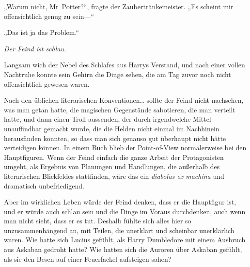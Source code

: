 „Warum nicht, Mr~Potter?“, fragte der Zaubertränkemeister. „Es scheint mir offensichtlich genug zu sein—“

„Das ist ja das Problem.“

\emph{Der Feind ist schlau.}

Langsam wich der Nebel des Schlafes aus Harrys Verstand, und nach einer vollen Nachtruhe konnte sein Gehirn die Dinge sehen, die am Tag zuvor noch nicht offensichtlich gewesen waren.

Nach den üblichen literarischen Konventionen… sollte der Feind nicht nachsehen, was man getan hatte, die magischen Gegenstände sabotieren, die man verteilt hatte, und dann einen Troll aussenden, der durch irgendwelche Mittel unauffindbar gemacht wurde, die die Helden nicht einmal im Nachhinein herausfinden konnten, so dass man sich genauso gut überhaupt nicht hätte verteidigen können. In einem Buch blieb der Point-of-View normalerweise bei den Hauptfiguren. Wenn der Feind einfach die ganze Arbeit der Protagonisten umgeht, als Ergebnis von Planungen und Handlungen, die außerhalb des literarischen Blickfeldes stattfinden, wäre das ein \emph{diabolus ex machina} und dramatisch unbefriedigend.

Aber im wirklichen Leben würde der Feind denken, dass er die Hauptfigur ist, und er würde auch schlau sein und die Dinge im Voraus durchdenken, auch wenn man nicht sieht, dass er es tut. Deshalb fühlte sich alles hier so unzusammenhängend an, mit Teilen, die unerklärt und scheinbar unerklärlich waren.
Wie hatte sich Lucius gefühlt, als Harry Dumbledore mit einem Ausbruch aus Askaban gedroht hatte? Wie hatten sich die Auroren über Askaban gefühlt, als sie den Besen auf einer Feuerfackel aufsteigen sahen?

